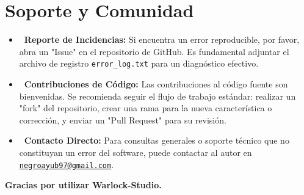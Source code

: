\documentclass[11pt, a4paper]{article}
\begin{document}
\section{Soporte y Comunidad}
\begin{itemize}[leftmargin=*]
    \item \textbf{\faBug\ Reporte de Incidencias:} Si encuentra un error reproducible, por favor, abra un "Issue" en el repositorio de GitHub. Es fundamental adjuntar el archivo de registro \texttt{error\_log.txt} para un diagnóstico efectivo.
    \item \textbf{\faCodeBranch\ Contribuciones de Código:} Las contribuciones al código fuente son bienvenidas. Se recomienda seguir el flujo de trabajo estándar: realizar un "fork" del repositorio, crear una rama para la nueva característica o corrección, y enviar un "Pull Request" para su revisión.
    \item \textbf{\faEnvelope\ Contacto Directo:} Para consultas generales o soporte técnico que no constituyan un error del software, puede contactar al autor en \href{mailto:negroayub97@gmail.com}{\texttt{negroayub97@gmail.com}}.
\end{itemize}
\vspace{1cm}
\centering
\textbf{Gracias por utilizar Warlock-Studio.}

\end{document}

